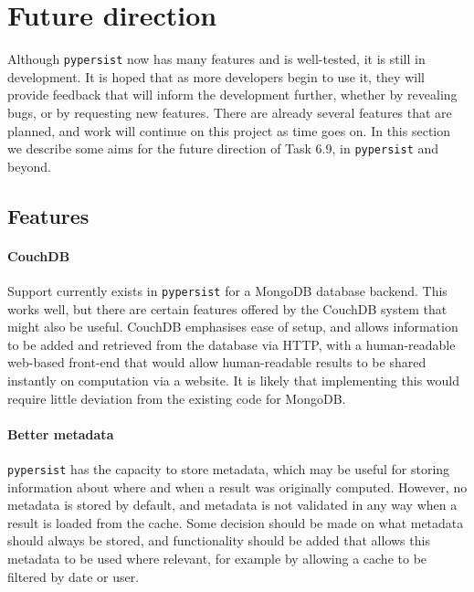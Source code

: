 \documentclass{deliverablereport}
\newcommand{\pypersist}{\texttt{pypersist}}
\begin{document}

\section{Future direction}
\label{sec:future}

Although \pypersist{} now has many features and is well-tested, it is still in
development.  It is hoped that as more developers begin to use it, they will
provide feedback that will inform the development further, whether by revealing
bugs, or by requesting new features.  There are already several features that
are planned, and work will continue on this project as time goes on.  In this
section we describe some aims for the future direction of Task 6.9, in
\pypersist{} and beyond.

\subsection{Features}

\paragraph{CouchDB}
Support currently exists in \pypersist{} for a MongoDB database backend.  This
works well, but there are certain features offered by the CouchDB system that
might also be useful.  CouchDB emphasises ease of setup, and allows information
to be added and retrieved from the database via HTTP, with a human-readable
web-based front-end that would allow human-readable results to be shared
instantly on computation via a website.  It is likely that implementing this
would require little deviation from the existing code for MongoDB.

\paragraph{Better metadata}
\pypersist{} has the capacity to store metadata, which may be useful for storing
information about where and when a result was originally computed.  However, no
metadata is stored by default, and metadata is not validated in any way when a
result is loaded from the cache.  Some decision should be made on what metadata
should always be stored, and functionality should be added that allows this
metadata to be used where relevant, for example by allowing a cache to be
filtered by date or user.
\end{document}
